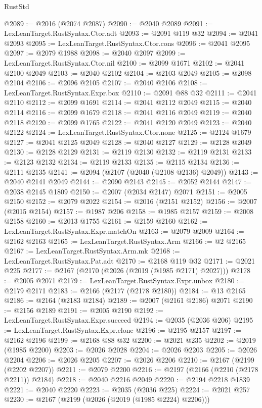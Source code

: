 \begin{lexlean}{RustStd}
\begin{coremodule}
@2089 := @2016 (@2074 @2087)
@2090 := @2040 @2089
@2091 := LexLeanTarget.RustSyntax.Ctor.adt
@2093 := @2091 @119 @32
@2094 := @2041 @2093
@2095 := LexLeanTarget.RustSyntax.Ctor.cons
@2096 := @2041 @2095
@2097 := @2079 @1988
@2098 := @2040 @2097
@2099 := LexLeanTarget.RustSyntax.Ctor.nil
@2100 := @2099 @1671
@2102 := @2041 @2100 @2049
@2103 := @2040 @2102
@2104 := @2103 @2049
@2105 := @2098 @2104
@2106 := @2096 @2105
@2107 := @2040 @2106
@2108 := LexLeanTarget.RustSyntax.Expr.box
@2110 := @2091 @88 @32
@2111 := @2041 @2110
@2112 := @2099 @1691
@2114 := @2041 @2112 @2049
@2115 := @2040 @2114
@2116 := @2099 @1679
@2118 := @2041 @2116 @2049
@2119 := @2040 @2118
@2120 := @2099 @1765
@2122 := @2041 @2120 @2049
@2123 := @2040 @2122
@2124 := LexLeanTarget.RustSyntax.Ctor.none
@2125 := @2124 @1679
@2127 := @2041 @2125 @2049
@2128 := @2040 @2127
@2129 := @2128 @2049
@2130 := @2128 @2129
@2131 := @2119 @2130
@2132 := @2119 @2131
@2133 := @2123 @2132
@2134 := @2119 @2133
@2135 := @2115 @2134
@2136 := @2111 @2135
@2141 := @2094 (@2107 (@2040 (@2108 @2136) @2049))
@2143 := @2040 @2141 @2049
@2144 := @2090 @2143
@2145 := @2052 @2144
@2147 := @2038 @2145 @1809
@2150 := @2007 (@2034 @2147) @2071
@2151 := @2005 @2150
@2152 := @2079 @2022
@2154 := @2016 (@2151 @2152)
@2156 := @2007 (@2015 @2154)
@2157 := @1987 @206
@2158 := @1985 @2157
@2159 := @2008 @2158
@2160 := @2013 @1755
@2161 := @2159 @2160
@2162 := LexLeanTarget.RustSyntax.Expr.matchOn
@2163 := @2079 @2009
@2164 := @2162 @2163
@2165 := LexLeanTarget.RustSyntax.Arm
@2166 := @2 @2165
@2167 := LexLeanTarget.RustSyntax.Arm.mk
@2168 := LexLeanTarget.RustSyntax.Pat.adt
@2170 := @2168 @119 @32
@2171 := @2021 @225
@2177 := @2167 (@2170 (@2026 (@2019 (@1985 @2171) @2027)))
@2178 := @2005 @2071
@2179 := LexLeanTarget.RustSyntax.Expr.unbox
@2180 := @2179 @2171
@2183 := @2166 (@2177 (@2178 @2180))
@2184 := @13 @2165
@2186 := @2164 (@2183 @2184)
@2189 := @2007 (@2161 @2186) @2071
@2190 := @2156 @2189
@2191 := @2005 @2190
@2192 := LexLeanTarget.RustSyntax.Expr.succeed
@2194 := @2035 (@2036 @206)
@2195 := LexLeanTarget.RustSyntax.Expr.clone
@2196 := @2195 @2157
@2197 := @2162 @2196
@2199 := @2168 @88 @32
@2200 := @2021 @235
@2202 := @2019 (@1985 @2200)
@2203 := @2026 @2028
@2204 := @2026 @2203
@2205 := @2026 @2204
@2206 := @2026 @2205
@2207 := @2026 @2206
@2210 := @2167 (@2199 (@2202 @2207))
@2211 := @2079 @2200
@2216 := @2197 (@2166 (@2210 (@2178 @2211)) @2184)
@2218 := @2040 @2216 @2049
@2220 := @2194 @2218 @1839
@2221 := @2040 @2220
@2223 := @2035 (@2036 @225)
@2224 := @2021 @257
@2230 := @2167 (@2199 (@2026 (@2019 (@1985 @2224) @2206)))

\end{coremodule}
\end{lexlean}
